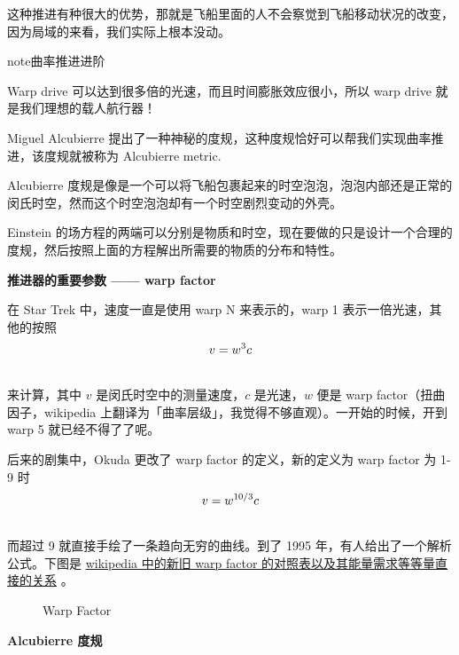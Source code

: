\documentclass[letterpaper,10pt]{sphinxmanual}
\begin{document}
这种推进有种很大的优势，那就是飞船里面的人不会察觉到飞船移动状况的改变，因为局域的来看，我们实际上根本没动。

\begin{notice}{note}{曲率推进进阶}

Warp drive 可以达到很多倍的光速，而且时间膨胀效应很小，所以 warp drive 就是我们理想的载人航行器！

Miguel Alcubierre 提出了一种神秘的度规，这种度规恰好可以帮我们实现曲率推进，该度规就被称为 Alcubierre metric.

Alcubierre 度规是像是一个可以将飞船包裹起来的时空泡泡，泡泡内部还是正常的闵氏时空，然而这个时空泡泡却有一个时空剧烈变动的外壳。

Einstein 的场方程的两端可以分别是物质和时空，现在要做的只是设计一个合理的度规，然后按照上面的方程解出所需要的物质的分布和特性。

\textbf{推进器的重要参数 —— warp factor}

在 Star Trek 中，速度一直是使用 warp N 来表示的，warp 1 表示一倍光速，其他的按照
\begin{gather}
\begin{split}v=w^3c\end{split}\notag\\\begin{split}\end{split}\notag
\end{gather}
来计算，其中 $v$ 是闵氏时空中的测量速度，$c$ 是光速，$w$ 便是 warp factor（扭曲因子，wikipedia 上翻译为「曲率层级」，我觉得不够直观）。一开始的时候，开到 warp 5 就已经不得了了呢。

后来的剧集中，Okuda 更改了 warp factor 的定义，新的定义为 warp factor 为 1-9 时
\begin{gather}
\begin{split}v=w^{10/3}c\end{split}\notag\\\begin{split}\end{split}\notag
\end{gather}
而超过 9 就直接手绘了一条趋向无穷的曲线。到了 1995 年，有人给出了一个解析公式。下图是 \href{http://en.wikipedia.org/wiki/File:Warptable.gif}{wikipedia 中的新旧 warp factor 的对照表以及其能量需求等等量直接的关系} 。
\begin{figure}[htbp]
\centering
\capstart
\caption{Warp Factor}\end{figure}

\textbf{Alcubierre 度规}


\end{notice}
\end{document}
